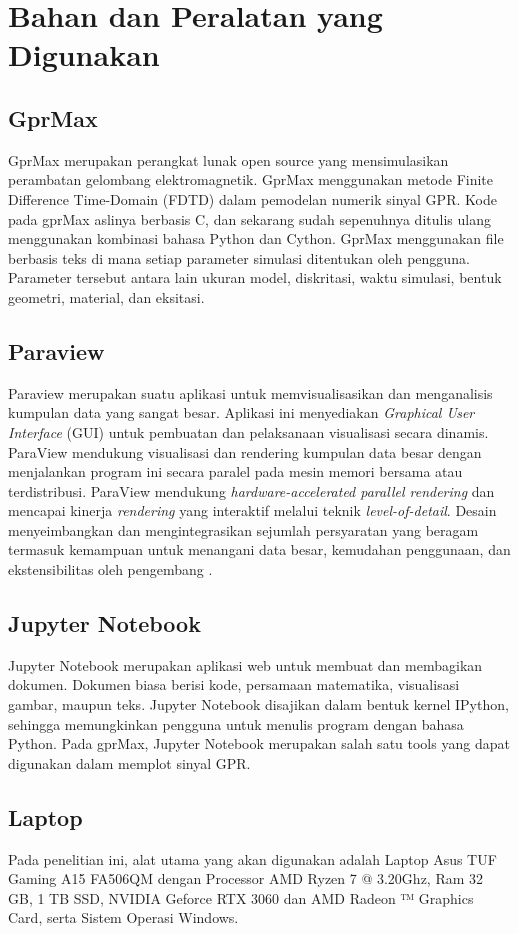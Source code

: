 \section{Bahan dan Peralatan yang Digunakan}
\label{sec:bahanPeralatan}

\subsection{GprMax}
\label{subsec:GprMax}

GprMax merupakan perangkat lunak open source yang mensimulasikan perambatan gelombang elektromagnetik. 
GprMax menggunakan metode Finite Difference Time-Domain (FDTD) dalam pemodelan numerik sinyal GPR. 
Kode pada gprMax aslinya berbasis C, dan sekarang sudah sepenuhnya ditulis ulang menggunakan kombinasi bahasa Python dan Cython. 
GprMax menggunakan file berbasis teks di mana setiap parameter simulasi ditentukan oleh pengguna. 
Parameter tersebut antara lain ukuran model, diskritasi, waktu simulasi, bentuk geometri, material, dan eksitasi.

\subsection{Paraview}
\label{paraview}

Paraview merupakan suatu aplikasi untuk memvisualisasikan dan menganalisis kumpulan data yang sangat besar.
Aplikasi ini menyediakan \emph{Graphical User Interface} (GUI) untuk pembuatan dan pelaksanaan visualisasi secara dinamis.
ParaView mendukung visualisasi dan rendering kumpulan data besar dengan menjalankan program ini secara paralel pada mesin memori bersama atau terdistribusi. 
ParaView mendukung \emph{hardware-accelerated parallel rendering} dan mencapai kinerja \emph{rendering} yang interaktif melalui teknik \emph{level-of-detail}.
Desain menyeimbangkan dan mengintegrasikan sejumlah persyaratan yang beragam termasuk kemampuan untuk menangani data besar, kemudahan penggunaan, dan ekstensibilitas oleh pengembang \parencite{paraview}.

\subsection{Jupyter Notebook}
\label{subsec:jupyter}

Jupyter Notebook merupakan aplikasi web untuk membuat dan membagikan dokumen. 
Dokumen biasa berisi kode, persamaan matematika, visualisasi gambar, maupun teks. 
Jupyter Notebook disajikan dalam bentuk kernel IPython, sehingga memungkinkan pengguna untuk menulis program dengan bahasa Python. 
Pada gprMax, Jupyter Notebook merupakan salah satu tools yang dapat digunakan dalam memplot sinyal GPR.

\subsection{Laptop}
\label{subsec:laptop}

Pada penelitian ini, alat utama yang akan digunakan adalah Laptop Asus TUF Gaming A15 FA506QM dengan Processor AMD Ryzen 7 @ 3.20Ghz, 
Ram 32 GB, 1 TB SSD, NVIDIA Geforce RTX 3060 dan AMD Radeon ™ Graphics Card, serta Sistem Operasi Windows.

